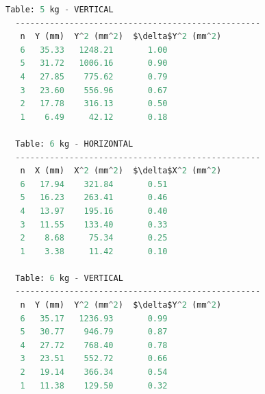 \documentclass[a4paper,11pt]{article}
\begin{document}
\begin{lstlisting}[language=Python]
  Table: 5 kg - VERTICAL
  --------------------------------------------------
   n  Y (mm)  Y^2 (mm^2)  $\delta$Y^2 (mm^2)
   6   35.33   1248.21       1.00
   5   31.72   1006.16       0.90
   4   27.85    775.62       0.79
   3   23.60    556.96       0.67
   2   17.78    316.13       0.50
   1    6.49     42.12       0.18
  
  Table: 6 kg - HORIZONTAL
  --------------------------------------------------
   n  X (mm)  X^2 (mm^2)  $\delta$X^2 (mm^2)
   6   17.94    321.84       0.51
   5   16.23    263.41       0.46
   4   13.97    195.16       0.40
   3   11.55    133.40       0.33
   2    8.68     75.34       0.25
   1    3.38     11.42       0.10
  
  Table: 6 kg - VERTICAL
  --------------------------------------------------
   n  Y (mm)  Y^2 (mm^2)  $\delta$Y^2 (mm^2)
   6   35.17   1236.93       0.99
   5   30.77    946.79       0.87
   4   27.72    768.40       0.78
   3   23.51    552.72       0.66
   2   19.14    366.34       0.54
   1   11.38    129.50       0.32
\end{lstlisting}
\label{output: 1}

\newpage
\end{document}
